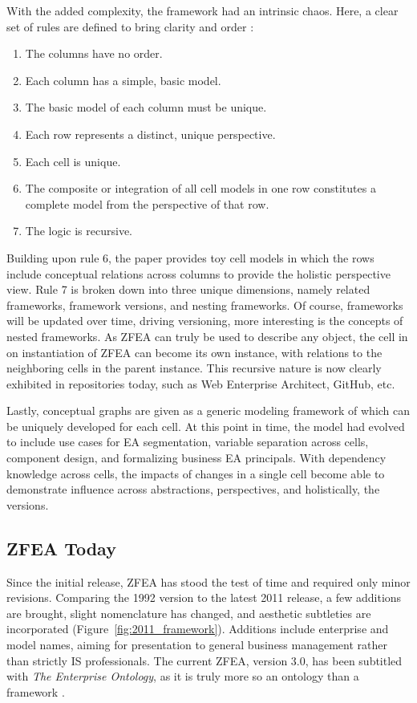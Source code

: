 \documentclass[12pt,conference]{IEEEtran}
\begin{document}
With the added complexity, the framework had an intrinsic chaos.
Here, a clear set of rules are defined to bring clarity and order \cite{zachman_ibm_1992}:
\begin{enumerate}
    \item The columns have no order.
    \item Each column has a simple, basic model.
    \item The basic model of each column must be unique.
    \item Each row represents a distinct, unique perspective.
    \item Each cell is unique.
    \item The composite or integration of all cell models in one row constitutes a complete model from the perspective of that row.
    \item The logic is recursive.
\end{enumerate}
Building upon rule 6, the paper provides toy cell models in which the rows include conceptual relations across columns to provide the holistic perspective view.
Rule 7 is broken down into three unique dimensions, namely related frameworks, framework versions, and nesting frameworks.
Of course, frameworks will be updated over time, driving versioning, more interesting is the concepts of nested frameworks.
As ZFEA can truly be used to describe any object, the cell in on instantiation of ZFEA can become its own instance, with relations to the neighboring cells in the parent instance.
This recursive nature is now clearly exhibited in repositories today, such as Web Enterprise Architect, GitHub, etc.

Lastly, conceptual graphs are given as a generic modeling framework of which can be uniquely developed for each cell.
At this point in time, the model had evolved to include use cases for EA segmentation, variable separation across cells, component design, and formalizing business EA principals.
With dependency knowledge across cells, the impacts of changes in a single cell become able to demonstrate influence across abstractions, perspectives, and holistically, the versions.

\subsection{ZFEA Today}
Since the initial release, ZFEA has stood the test of time and required only minor revisions.
Comparing the 1992 version to the latest 2011 release, a few additions are brought, slight nomenclature has changed, and aesthetic subtleties are incorporated (Figure~\ref{fig:2011_framework}).
Additions include enterprise and model names, aiming for presentation to general business management rather than strictly IS professionals.
The current ZFEA, version 3.0, has been subtitled with \emph{The Enterprise Ontology}, as it is truly more so an ontology than a framework \cite{Zachman_Evolution}.
\end{document}
